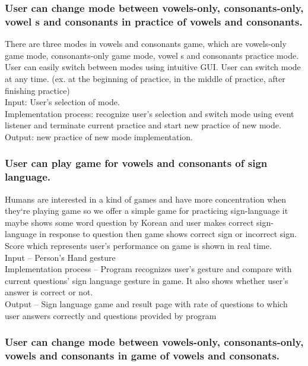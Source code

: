 \documentclass[10pt,journal,compsoc]{IEEEtran}
\begin{document}
\subsubsection{User can change mode between  vowels-only, consonants-only, vowel s and consonants in practice of vowels and consonants.\\}
There are three modes in vowels and consonants game, which are vowels-only game mode, consonants-only game mode, vowel s and consonants practice mode. User can easily switch between modes using intuitive GUI. User can switch mode at any time.
(ex. at the beginning of practice, in the middle of practice, after finishing practice)
\\Input: User’s selection of mode.
\\Implementation process: recognize user’s selection and switch mode using event listener and terminate current practice and start new practice of new mode. 
\\Output: new practice of new mode implementation.


\subsubsection{User can play game for vowels and consonants of sign language.\\}

Humans are interested in a kind of games and have more concentration when they`re playing game so we offer a simple game for practicing sign-language it maybe shows some word question by Korean and user makes correct sign-language in response to question then game shows correct sign or incorrect sign.
Score which represents user’s performance on game is shown in real time.
\\Input – Person's Hand gesture
\\Implementation process – Program recognizes user’s gesture and compare with current questions’ sign language gesture in game. It also shows whether user’s answer is correct or not.
\\Output – Sign language game and result page with rate of questions to which user answers correctly and questions provided by program




\subsubsection{User can change mode between  vowels-only, consonants-only, vowels and consonants in game of vowels and consonats.\\}
\end{document}
